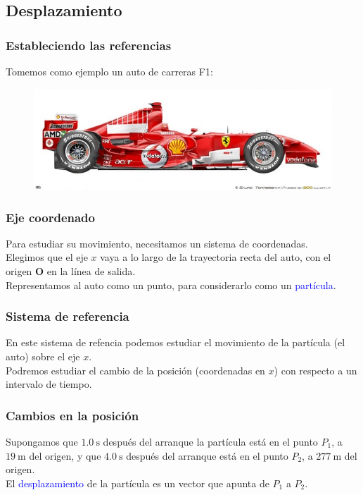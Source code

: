 \subsection*{Desplazamiento}
\begin{frame}
\frametitle{Estableciendo las referencias}
Tomemos como ejemplo un auto de carreras F1:
\begin{figure}
    \centering
    \includegraphics[scale=0.3]{./Imagenes/ferrari.jpg}
\end{figure}
\end{frame}
\begin{frame}
\frametitle{Eje coordenado}
Para estudiar su movimiento, necesitamos un sistema de coordenadas.
\\
\bigskip
\pause
Elegimos que el eje $x$ vaya a lo largo de la trayectoria recta del auto, con el origen $\mathbf{O}$ en la línea de salida.
\\
\bigskip
\pause
Representamos al auto como un punto, para considerarlo como un \textcolor{blue}{partícula}.
\end{frame}
\begin{frame}
\frametitle{Sistema de referencia}
\begin{figure}
    \centering
    
\end{figure}
En este sistema de refencia podemos estudiar el movimiento de la partícula (el auto) sobre el eje $x$.
\\
\bigskip
Podremos estudiar el cambio de la posición (coordenadas en $x$) con respecto a un intervalo de tiempo.
\end{frame}
\begin{frame}
\frametitle{Cambios en la posición}
Supongamos que $\SI{1.0}{\second}$ después del arranque la partícula está en el punto $P_{1}$, a $\SI{19}{\meter}$ del origen, y que $\SI{4.0}{\second}$ después del arranque está en el punto
$P_{2}$, a $\SI{277}{\meter}$ del origen.
\\
\bigskip
\pause
El \textcolor{blue}{desplazamiento} de la partícula es un vector que apunta de
$P_{1}$ a $P_{2}$.
\end{frame}
